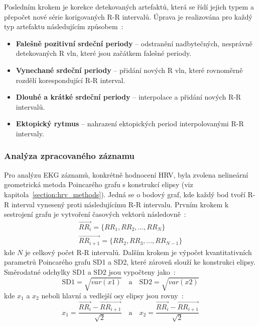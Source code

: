Posledním krokem je korekce detekovaných artefaktů, která se řídí jejich typem a
přepočet nové série korigovaných R-R intervalů. Úprava je realizována
pro každý typ artefaktu následujícím způsobem~\cite{Lipponen2019}:
\begin{itemize}
    \item \textbf{Falešně pozitivní srdeční periody} -- odstranění
          nadbytečných, nesprávně detekovaných R vln, které jsou začátkem falešné
          periody.
    \item \textbf{Vynechané srdeční periody} -- přidání nových R vln, které
          rovnoměrně rozdělí korespondující R-R interval.
    \item \textbf{Dlouhé a krátké srdeční periody} -- interpolace a přidání
          nových R-R intervalů.
    \item \textbf{Ektopický rytmus} -- nahrazení ektopických period interpolovanými R-R intervaly.
\end{itemize}

\subsubsection{Analýza zpracovaného záznamu}
\label{section:analysis}
Pro analýzu EKG záznamů, konkrétně hodnocení HRV, byla zvolena nelineární
geometrická metoda Poincarého grafu s konstrukcí elipsy (viz
kapitola~\ref{section:hrv_methods}). Jedná se o bodový graf, kde každý bod tvoří
R-R interval vynesený proti následujícímu R-R intervalu. Prvním krokem k
sestrojení grafu je vytvoření časových vektorů následovně~\cite{Mazhar2007}:
\begin{gather}
    \overrightarrow{RR_i} = \{RR_1, RR_2,...,RR_{N}\} \\
    \overrightarrow{RR_{i+1}} = \{RR_2, RR_3,...,RR_{N-1}\}
\end{gather}
kde $N$ je celkový počet R-R intervalů. Dalším krokem je výpočet kvantitativních
parametrů Poincarého grafu SD1 a SD2, které zároveň slouží ke konstrukci
elipsy. Směrodatné odchylky SD1 a SD2 jsou vypočteny jako~\cite{Mazhar2007}:
\begin{equation}
    \text{SD1} = \sqrt{var(x1)}
    \quad \textrm{a} \quad
    \text{SD2} = \sqrt{var(x2)}
\end{equation}
kde $x_1$ a $x_2$ neboli hlavní a vedlejší osy elipsy jsou
rovny~\cite{Mazhar2007}:
\begin{equation}
    x_1 = \frac{\overrightarrow{RR_i}-\overrightarrow{RR_{i+1}}}{\sqrt{2}}
    \quad \textrm{a} \quad
    x_2 = \frac{\overrightarrow{RR_i}-\overrightarrow{RR_{i+1}}}{\sqrt{2}}
\end{equation}

